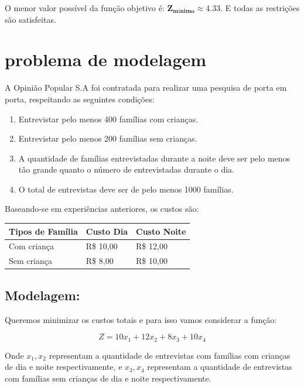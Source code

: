 \documentclass[12pt, a4paper]{article}
\begin{document}
O menor valor possível da função objetivo é: $\mathbf{Z_{mínimo} \approx 4.33}$. E todas as restrições são satisfeitas.

\cleardoublepage
\section[Problema adicional]{problema de modelagem}
A Opinião Popular S.A foi contratada para realizar uma pesquisa de porta em porta, respeitando as seguintes condições:

\begin{enumerate}
  \item Entrevistar pelo menos 400 famílias com crianças.
  \item Entrevistar pelo menos 200 famílias sem crianças.
  \item A quantidade de famílias entrevistadas durante a noite deve ser pelo menos tão grande quanto o número de entrevistadas durante o dia.
  \item O total de entrevistas deve ser de pelo menos 1000 famílias.
\end{enumerate}

Baseando-se em experiências anteriores, os custos são:

\begin{table}[htb]
  \centering
  \begin{tabular}{lll}
    \toprule
    Tipos de Família & Custo Dia & Custo Noite \\
    \midrule
    Com criança & R\$ 10,00 & R\$ 12,00 \\
    Sem criança & R\$ 8,00 & R\$ 10,00 \\
    \bottomrule
  \end{tabular}
\end{table}

\subsection[Modelagem]{Modelagem:}

Queremos minimizar os custos totais e para isso vamos considerar a função:

\begin{equation*}
  Z = 10x_1 + 12x_2 + 8x_3 + 10x_4
\end{equation*}

Onde $x_1, x_2$ representam a quantidade  de entrevistas com famílias com crianças de dia e noite respectivamente, e $x_3, x_4$ representam a quantidade de entrevistas com famílias sem crianças de dia e noite respectivamente.
\end{document}
